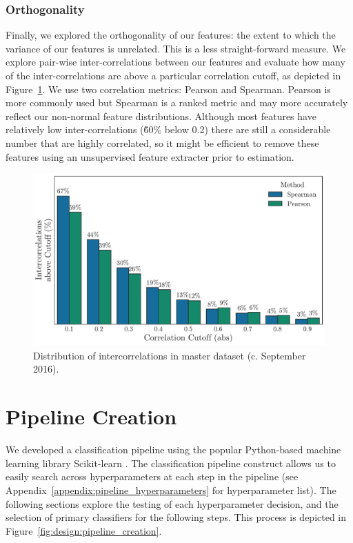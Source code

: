 \documentclass[../thesis/thesis.tex]{subfiles}
\begin{document}
\subsubsection{Orthogonality}

Finally, we explored the orthogonality of our features: the extent to which the variance of our features is unrelated. This is a less straight-forward measure. We explore pair-wise inter-correlations between our features and evaluate how many of the inter-correlations are above a particular correlation cutoff, as depicted in Figure~\ref{fig:design:orthogonality}. We use two correlation metrics: Pearson and Spearman. Pearson is more commonly used but Spearman is a ranked metric and may more accurately reflect our non-normal feature distributions. Although most features have relatively low inter-correlations (\~60\% below 0.2) there are still a considerable number that are highly correlated, so it might be efficient to remove these features using an unsupervised feature extracter prior to estimation.

\begin{figure}[!htb]
    \centering
    \includegraphics[width=\textwidth]{../figures/design/orthogonality}
    \caption[Distribution of intercorrelations]{Distribution of intercorrelations in master dataset (c. September 2016).}
    \label{fig:design:orthogonality}
\end{figure}

\section{Pipeline Creation}

We developed a classification pipeline using the popular Python-based machine learning library Scikit-learn \cite{pedregosa2011}. The classification pipeline construct allows us to easily search across hyperparameters at each step in the pipeline (see Appendix~\ref{appendix:pipeline_hyperparameters} for hyperparameter list). The following sections explore the testing of each hyperparameter decision, and the selection of primary classifiers for the following steps. This process is depicted in Figure~\ref{fig:design:pipeline_creation}.
\end{document}
